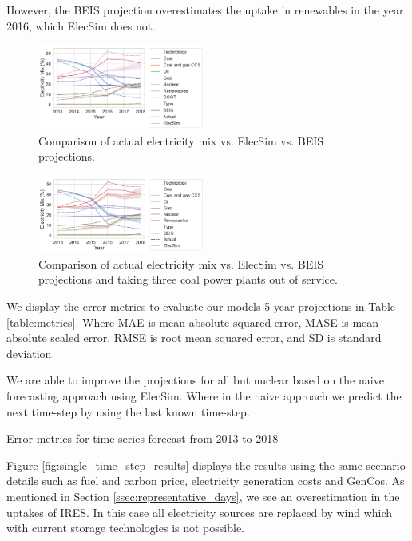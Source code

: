 \documentclass[final,3p,times,twocolumn,numbers]{elsarticle}
\begin{document}
However, the BEIS projection overestimates the uptake in renewables in the year 2016, which ElecSim does not.


\begin{figure}
\centering
\includegraphics[width=0.49\textwidth]{figures/results/throughout_years_beis_elecsim_comparison.pdf}
\caption{Comparison of actual electricity mix vs. ElecSim vs. BEIS projections.}
\label{fig:beis_elecsim_historic_comparison}
\end{figure}


\begin{figure}
\centering
\includegraphics[width=0.49\textwidth]{figures/results/comparison-between-beis-elecsim-actual.png}
\caption{Comparison of actual electricity mix vs. ElecSim vs. BEIS projections and taking three coal power plants out of service.}
\label{fig:beis_elecsim_historic_comparison}
\end{figure}


We display the error metrics to evaluate our models 5 year projections in Table \ref{table:metrics}. Where MAE is mean absolute squared error, MASE is mean absolute scaled error, RMSE is root mean squared error, and SD is standard deviation.

We are able to improve the projections for all but nuclear based on the naive forecasting approach using ElecSim. Where in the naive approach we predict the next time-step by using the last known time-step. 


\begin{table}[htb]
    \centering
{}
    \caption{Error metrics for time series forecast from 2013 to 2018}
    \label{table:metrics}
\end{table}

Figure \ref{fig:single_time_step_results} displays the results using the same scenario details such as fuel and carbon price, electricity generation costs and GenCos. As mentioned in Section \ref{ssec:representative_days}, we see an overestimation in the uptakes of IRES. In this case all electricity sources are replaced by wind which with current storage technologies is not possible.
\end{document}
